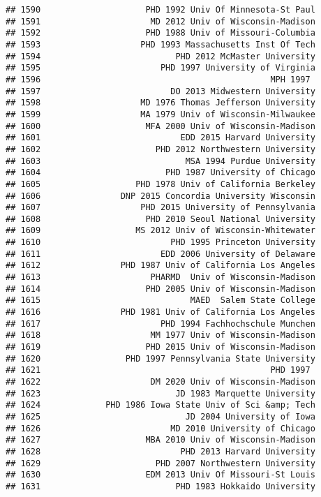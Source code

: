 \documentclass[
]{article}
\begin{document}
\begin{verbatim}
## 1590                     PHD 1992 Univ Of Minnesota-St Paul
## 1591                      MD 2012 Univ of Wisconsin-Madison
## 1592                     PHD 1988 Univ of Missouri-Columbia
## 1593                    PHD 1993 Massachusetts Inst Of Tech
## 1594                           PHD 2012 McMaster University
## 1595                        PHD 1997 University of Virginia
## 1596                                              MPH 1997 
## 1597                          DO 2013 Midwestern University
## 1598                    MD 1976 Thomas Jefferson University
## 1599                    MA 1979 Univ of Wisconsin-Milwaukee
## 1600                     MFA 2000 Univ of Wisconsin-Madison
## 1601                            EDD 2015 Harvard University
## 1602                       PHD 2012 Northwestern University
## 1603                             MSA 1994 Purdue University
## 1604                         PHD 1987 University of Chicago
## 1605                   PHD 1978 Univ of California Berkeley
## 1606                DNP 2015 Concordia University Wisconsin
## 1607                    PHD 2015 University of Pennsylvania
## 1608                     PHD 2010 Seoul National University
## 1609                   MS 2012 Univ of Wisconsin-Whitewater
## 1610                          PHD 1995 Princeton University
## 1611                        EDD 2006 University of Delaware
## 1612                PHD 1987 Univ of California Los Angeles
## 1613                      PHARMD  Univ of Wisconsin-Madison
## 1614                     PHD 2005 Univ of Wisconsin-Madison
## 1615                              MAED  Salem State College
## 1616                PHD 1981 Univ of California Los Angeles
## 1617                        PHD 1994 Fachhochschule Munchen
## 1618                      MM 1977 Univ of Wisconsin-Madison
## 1619                     PHD 2015 Univ of Wisconsin-Madison
## 1620                 PHD 1997 Pennsylvania State University
## 1621                                              PHD 1997 
## 1622                      DM 2020 Univ of Wisconsin-Madison
## 1623                           JD 1983 Marquette University
## 1624             PHD 1986 Iowa State Univ of Sci &amp; Tech
## 1625                             JD 2004 University of Iowa
## 1626                          MD 2010 University of Chicago
## 1627                     MBA 2010 Univ of Wisconsin-Madison
## 1628                            PHD 2013 Harvard University
## 1629                       PHD 2007 Northwestern University
## 1630                     EDM 2013 Univ Of Missouri-St Louis
## 1631                           PHD 1983 Hokkaido University

\end{verbatim}
\end{document}
